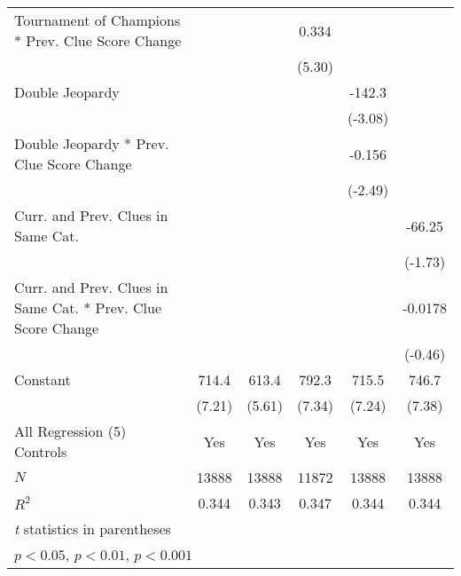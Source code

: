 \begin{table}[htbp]
\begin{tabular}{l*{5}{c}}
Tournament of Champions * Prev. Clue Score Change&                     &                     &       0.334\sym{***}&                     &                     \\
            &                     &                     &      (5.30)         &                     &                     \\
Double Jeopardy&                     &                     &                     &      -142.3\sym{**} &                     \\
            &                     &                     &                     &     (-3.08)         &                     \\
Double Jeopardy * Prev. Clue Score Change&                     &                     &                     &      -0.156\sym{*}  &                     \\
            &                     &                     &                     &     (-2.49)         &                     \\
Curr. and Prev. Clues in Same Cat.&                     &                     &                     &                     &      -66.25         \\
            &                     &                     &                     &                     &     (-1.73)         \\
Curr. and Prev. Clues in Same Cat. * Prev. Clue Score Change&                     &                     &                     &                     &     -0.0178         \\
            &                     &                     &                     &                     &     (-0.46)         \\
Constant    &       714.4\sym{***}&       613.4\sym{***}&       792.3\sym{***}&       715.5\sym{***}&       746.7\sym{***}\\
            &      (7.21)         &      (5.61)         &      (7.34)         &      (7.24)         &      (7.38)         \\
All Regression (5) Controls&         Yes         &         Yes         &         Yes         &         Yes         &         Yes         \\
\hline
\(N\)       &       13888         &       13888         &       11872         &       13888         &       13888         \\
\(R^{2}\)   &       0.344         &       0.343         &       0.347         &       0.344         &       0.344         \\
\hline\hline
\multicolumn{6}{l}{\footnotesize \textit{t} statistics in parentheses}\\
\multicolumn{6}{l}{\footnotesize \sym{*} \(p<0.05\), \sym{**} \(p<0.01\), \sym{***} \(p<0.001\)}\\
\end{tabular}
\end{table}
